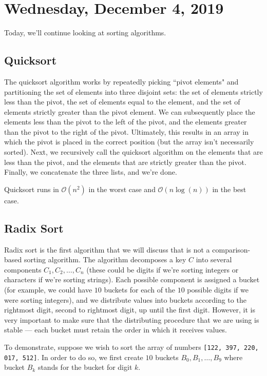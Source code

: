 \section{Wednesday, December 4, 2019}

Today, we'll continue looking at sorting algorithms.

\subsection{Quicksort}

The quicksort algorithm works by repeatedly picking ``pivot elements" and partitioning the set of elements into three disjoint sets: the set of elements strictly less than the pivot, the set of elements equal to the element, and the set of elements strictly greater than the pivot element. We can subsequently place the elements less than the pivot to the left of the pivot, and the elements greater than the pivot to the right of the pivot. Ultimately, this results in an array in which the pivot is placed in the correct position (but the array isn't necessarily sorted). Next, we recursively call the quicksort algorithm on the elements that are less than the pivot, and the elements that are strictly greater than the pivot. Finally, we concatenate the three lists, and we're done.

Quicksort runs in $\mathcal{O}(n^2)$ in the worst case and $\mathcal{O}(n\log(n))$ in the best case.

 \subsection{Radix Sort}
 
 Radix sort is the first algorithm that we will discuss that is not a comparison-based sorting algorithm. The algorithm decomposes a key $C$ into several components $C_1, C_2, \ldots, C_n$ (these could be digits if we're sorting integers or characters if we're sorting strings). Each possible component is assigned a bucket (for example, we could have $10$ buckets for each of the $10$ possible digits if we were sorting integers), and we distribute values into buckets according to the rightmost digit, second to rightmost digit, up until the first digit. However, it is very important to make sure that the distributing procedure that we are using is stable --- each bucket must retain the order in which it receives values.
 
 To demonstrate, suppose we wish to sort the array of numbers \verb![122, 397, 220, 017, 512]!. In order to do so, we first create $10$ buckets $B_{0}, B_{1}, \ldots, B_{9}$ where bucket $B_{k}$ stands for the bucket for digit $k$.
 
